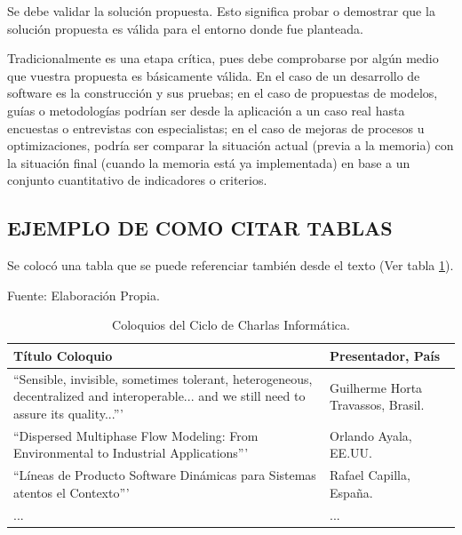 \documentclass[letterpaper,12pt]{article}
\begin{document}
Se debe validar la solución propuesta. Esto significa probar o demostrar que la solución propuesta es válida para el entorno donde fue planteada.

Tradicionalmente es una etapa crítica, pues debe comprobarse por algún medio que vuestra propuesta es básicamente válida. En el caso de un desarrollo de software es la construcción y sus pruebas; en el caso de propuestas de modelos, guías o metodologías podrían ser desde la aplicación a un caso real hasta encuestas o entrevistas con especialistas; en el caso de mejoras de procesos u optimizaciones, podría ser comparar la situación actual (previa a la memoria) con la situación final (cuando la memoria está ya implementada) en base a un conjunto cuantitativo de indicadores o criterios.

\subsection{EJEMPLO DE COMO CITAR TABLAS}

Se colocó una tabla que se puede referenciar también desde el texto (Ver tabla \ref{table:coloquios}).

\begin{table}[h]
    \centering
    \caption{\label{table:coloquios} Coloquios del Ciclo de Charlas Informática.} Fuente: Elaboración Propia.
    \begin{tabular}{|p{7cm}|p{7cm}|}
        \hline
        Título Coloquio                                                                                                                            & Presentador, País                  \\
        \hline
        ``Sensible, invisible, sometimes tolerant, heterogeneous, decentralized and interoperable... and we still need to assure its quality...''' & Guilherme Horta Travassos, Brasil. \\
        \hline
        ``Dispersed Multiphase Flow Modeling: From Environmental to Industrial Applications'''                                                     & Orlando Ayala, EE.UU.              \\
        \hline
        ``Líneas de Producto Software Dinámicas para Sistemas atentos el Contexto'''                                                               & Rafael Capilla, España.            \\
        \hline
        ...                                                                                                                                        & ...                                \\
        \hline
    \end{tabular}
\end{table}
\end{document}
